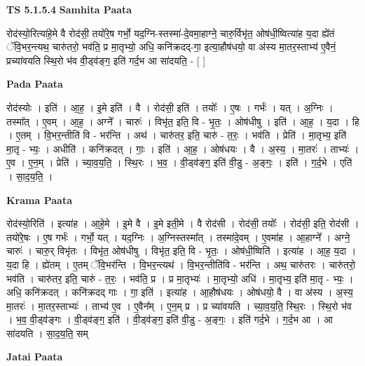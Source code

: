 \documentclass[17pt]{extarticle}
\begin{document}
\textbf{TS 5.1.5.4 } \newline
\textbf{Samhita Paata} \newline

रोद॑स्यो॒रित्या॑हे॒मे वै रोद॑सी॒ तयो॑रे॒ष गर्भो॒ यद॒ग्नि-स्तस्मा॑-दे॒वमा॒हाग्ने॒ चारु॒र्विभृ॑त॒ ओष॑धी॒ष्वित्या॑ह य॒दा ह्ये॑तं ॅवि॒भर॒न्त्यथ॒ चारु॑तरो॒ भव॑ति॒ प्र मा॒तृभ्यो॒ अधि॒ कनि॑क्रदद्-गा॒ इत्या॒हौष॑धयो॒ वा अ॑स्य मा॒तर॒स्ताभ्य॑ ए॒वैनं॒ प्रच्या॑वयति स्थि॒रो भ॑व वी॒ड्व॑ङ्ग॒ इति॑ गर्द॒भ आ सा॑दयति॒ - [  ] \newline

\textbf{Pada Paata} \newline

रोद॑स्योः । इति॑ । आ॒ह॒ । इ॒मे इति॑ । वै । रोद॑सी॒ इति॑ । तयोः᳚ । ए॒षः । गर्भः॑ । यत् । अ॒ग्निः । तस्मा᳚त् । ए॒वम् । आ॒ह॒ । अग्ने᳚ । चारुः॑ । विभृ॑त॒ इति॒ वि - भृ॒तः॒ । ओष॑धीषु । इति॑ । आ॒ह॒ । य॒दा । हि । ए॒तम् । वि॒भर॒न्तीति॑ वि - भर॑न्ति । अथ॑ । चारु॑तर॒ इति॒ चारु॑ - त॒रः॒ । भव॑ति । प्रेति॑ । मा॒तृभ्य॒ इति॑ मा॒तृ - भ्यः॒ । अधीति॑ । कनि॑क्रदत् । गाः॒ । इति॑ । आ॒ह॒ । ओष॑धयः । वै । अ॒स्य॒ । मा॒तरः॑ । ताभ्यः॑ । ए॒व । ए॒न॒म् । प्रेति॑ । च्या॒व॒य॒ति॒ । स्थि॒रः । भ॒व॒ । वी॒ड्व॑ङ्ग॒ इति॑ वी॒डु - अ॒ङ्गः॒ । इति॑ । ग॒र्द॒भे । एति॑ । सा॒द॒य॒ति॒ ।  \newline


\textbf{Krama Paata} \newline

रोद॑स्यो॒रिति॑ । इत्या॑ह । आ॒हे॒मे । इ॒मे वै । इ॒मे इती॒मे । वै रोद॑सी । रोद॑सी॒ तयोः᳚ । रोद॑सी॒ इति॒ रोद॑सी । तयो॑रे॒षः । ए॒ष गर्भः॑ । गर्भो॒ यत् । यद॒ग्निः । अ॒ग्निस्तस्मा᳚त् । तस्मा॑दे॒वम् । ए॒वमा॑ह । आ॒हाग्ने᳚ । अग्ने॒ चारुः॑ । चारु॒र् विभृ॑तः । विभृ॑त॒ ओष॑धीषु । विभृ॑त॒ इति॒ वि - भृ॒तः॒ । ओष॑धी॒ष्विति॑ । इत्या॑ह । आ॒ह॒ य॒दा । य॒दा हि । ह्ये॑तम् । ए॒तम् ॅवि॒भर॑न्ति । वि॒भर॒न्त्यथ॑ । वि॒भर॒न्तीति॑वि - भर॑न्ति । अथ॒ चारु॑तरः । चारु॑तरो॒ भव॑ति । चारु॑तर॒ इति॒ चारु॑ - त॒रः॒ । भव॑ति॒ प्र । प्र मा॒तृभ्यः॑ । मा॒तृभ्यो॒ अधि॑ । मा॒तृभ्य॒ इति॑ मा॒तृ - भ्यः॒ । अधि॒ कनि॑क्रदत् । कनि॑क्रदद् गाः । गा॒ इति॑ । इत्या॑ह । आ॒हौष॑धयः । ओष॑धयो॒ वै । वा अ॑स्य । अ॒स्य॒ मा॒तरः॑ । मा॒तर॒स्ताभ्यः॑ । ताभ्य॑ ए॒व । ए॒वैन᳚म् । ए॒न॒म् प्र । प्र च्या॑वयति । च्या॒व॒य॒ति॒ स्थि॒रः । स्थि॒रो भ॑व । भ॒व॒ वी॒ड्व॑ङ्गः । वी॒ड्व॑ङ्ग॒ इति॑ । वी॒ड्व॑ङ्ग॒ इति॑ वी॒डु - अ॒ङ्गः॒ । इति॑ गर्द॒भे । ग॒र्द॒भ आ । आ सा॑दयति । सा॒द॒य॒ति॒ सम् \newline

\textbf{Jatai Paata} \newline
\end{document}
